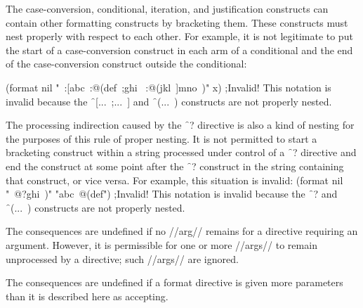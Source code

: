\endsubsection%



The case-conversion, conditional, iteration, and justification constructs can contain other formatting constructs by bracketing them. These constructs must nest properly with respect to each other. For example, it is not legitimate to put the start of a case-conversion construct in each arm of a conditional and the end of the case-conversion construct outside the conditional:

\code
 (format nil "~:[abc~:@(def~;ghi~ :@(jkl~]mno~)" x) ;Invalid! \endcode This notation is invalid because the \f{~[...~;...~]} and \f{~(...~)} constructs are not properly nested.
                                   

The processing indirection caused by the \f{~?} directive is also a kind of nesting for the purposes of this rule of proper nesting. It is not permitted to start a bracketing construct within a string processed under control of a \f{~?}                                       directive and end the construct at some point after the \f{~?} construct in the string containing that construct, or vice versa. For example, this situation is invalid:
                                                                                \code
 (format nil "~@?ghi~)" "abc~@(def") ;Invalid! \endcode This notation is invalid because the \f{~?} and \f{~(...~)} constructs are not properly nested.

\endsubsubsection%


The consequences are undefined if no //arg// remains for a directive  requiring an argument.  However, it is permissible for one or more //args//  to remain unprocessed by a directive; such //args// are ignored.
  \endsubsubsection%


The consequences are undefined if a format directive is given more parameters  than it is described here as accepting.

\endsubsubsection%


